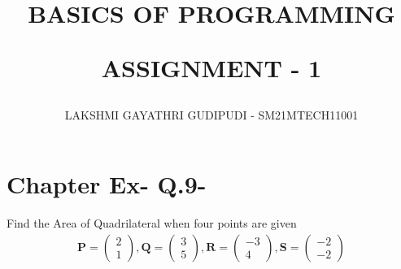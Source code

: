 \documentclass[journal,12pt,twocolumn]{IEEEtran}
\begin{document}
\newcommand{\myvec}[1]{\ensuremath{\begin{pmatrix}#1\end{pmatrix}}}
\newcommand{\cmyvec}[1]{\ensuremath{\begin{pmatrix*}[c]#1\end{pmatrix*}}}
\providecommand{\norm}[1]{\lVert#1\rVert}
\newcommand{\mydet}[1]{\ensuremath{\begin{vmatrix}#1\end{vmatrix}}}
\newcommand{\proj}[2]{\textbf{proj}_{\vec{#1}}\vec{#2}}
\newcommand{\RNum}[1]{\uppercase\expandafter{\romannumeral #1\relax}}
\newcommand{\Rnum}[1]{\lowercase\expandafter{\romannumeral #1\relax}}
\let\StandardTheFigure\thefigure
\let\vec\mathbf

\title{
BASICS OF PROGRAMMING

ASSIGNMENT - 1
}
\author{ LAKSHMI GAYATHRI GUDIPUDI - SM21MTECH11001}
\maketitle
\newpage
\bigskip
\renewcommand{\thefigure}{\theenumi}

\section*{ Chapter \RNum{2} Ex-\RNum{2} Q.9-\Rnum{2}}
\noindent


Find the Area of Quadrilateral when four points are given
\begin{align}
\vec{P} = \myvec{2\\1}, \vec{Q} =\myvec{3\\5},
\vec{R} =\myvec{-3\\4}, \vec{S} =\myvec{-2\\-2}
\end{align}
\noindent
\end{document}
